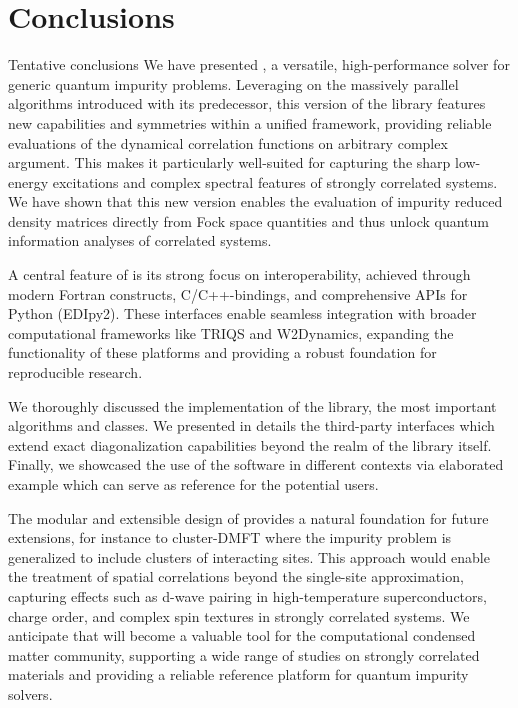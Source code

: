 \documentclass[edipack_sp.tex]{subfiles}
\begin{document}
\section{Conclusions}
{\color{red} Tentative conclusions}
We have presented \NAME{}, a versatile, high-performance solver for
generic quantum impurity problems. Leveraging on the massively
parallel algorithms introduced with its predecessor, this version of
the library features new capabilities and symmetries within a unified
framework, providing reliable evaluations of the dynamical correlation
functions on arbitrary complex argument.
This makes it particularly well-suited for capturing the sharp
low-energy excitations and complex spectral features of strongly
correlated systems. We have shown that this new version enables the evaluation of impurity
reduced density matrices directly from Fock space quantities and thus unlock 
quantum information analyses of correlated systems.  

A central feature of \NAME is its strong focus on interoperability,
achieved through modern Fortran constructs, C/C++-bindings, and
comprehensive APIs for Python (EDIpy2). 
These interfaces enable seamless integration with broader
computational frameworks like TRIQS and W2Dynamics, expanding the
functionality of these platforms and providing a robust foundation for
reproducible research.

We thoroughly discussed the implementation of the \NAME library, the
most important algorithms and classes. We presented in
details the third-party interfaces which extend exact diagonalization
capabilities beyond the realm of the library itself.   
Finally, we showcased the use of the \NAME software in different
contexts via elaborated example which can serve as reference for the
potential users. 

The modular and extensible design of \NAME provides a
natural foundation for future extensions, for instance to cluster-DMFT where the
impurity problem is generalized to include clusters of interacting
sites. This approach would enable the treatment of spatial
correlations beyond the single-site approximation, capturing effects
such as d-wave pairing in high-temperature superconductors, charge
order, and complex spin textures in strongly correlated systems.
We anticipate that \NAME will become a valuable tool for the
computational condensed matter community, supporting a wide range of
studies on strongly correlated materials and providing a reliable
reference platform for quantum impurity solvers.
\end{document}
